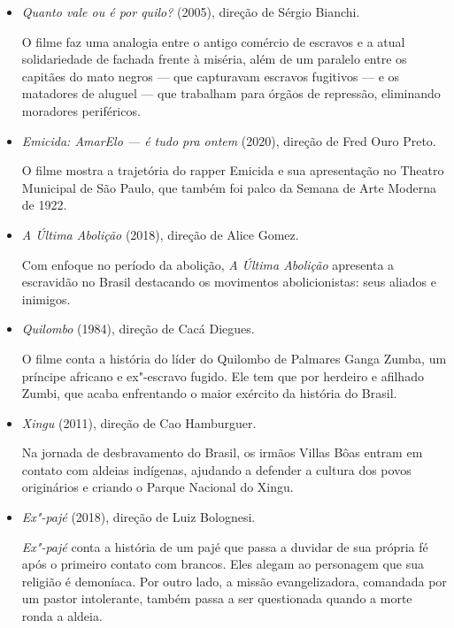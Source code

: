 \documentclass[12pt]{extarticle}
\begin{document}
\begin{itemize}
\item\emph{Quanto vale ou é por quilo?} (2005), direção de Sérgio Bianchi.

O filme faz uma analogia entre o antigo comércio de escravos e 
a atual solidariedade de fachada frente à miséria, além de um paralelo 
entre os capitães do mato negros --- que capturavam escravos 
fugitivos --- e os matadores de aluguel --- que trabalham
para órgãos de repressão, eliminando moradores periféricos.

\item\emph{Emicida: AmarElo --- é tudo pra ontem} (2020), 
direção de Fred Ouro Preto.

O filme mostra a trajetória do rapper Emicida e sua apresentação no 
Theatro Municipal de São Paulo, que também foi palco 
da Semana de Arte Moderna de 1922.

\item\emph{A Última Abolição} (2018), direção de Alice Gomez.

Com enfoque no período da abolição, \emph{A Última Abolição} apresenta 
a escravidão no Brasil destacando os movimentos 
abolicionistas: seus aliados e inimigos.

\item\emph{Quilombo} (1984), direção de Cacá Diegues.

O filme conta a história do líder do Quilombo de Palmares Ganga Zumba, 
um príncipe africano e ex"-escravo fugido. Ele tem que por herdeiro e afilhado Zumbi, 
que acaba enfrentando o maior exército da história do Brasil.

\item\emph{Xingu} (2011), direção de Cao Hamburguer.

Na jornada de desbravamento do Brasil, os irmãos Villas Bôas 
entram em contato com aldeias indígenas, ajudando a defender 
a cultura dos povos originários e criando o Parque Nacional do Xingu.

\item\emph{Ex"-pajé} (2018), direção de Luiz Bolognesi.

\emph{Ex"-pajé} conta a história de um pajé que passa a duvidar de sua 
própria fé após o primeiro contato com brancos. Eles alegam ao 
personagem que sua religião é demoníaca. Por outro lado, a 
missão evangelizadora, comandada por um pastor intolerante, 
também passa a ser questionada quando a morte ronda a aldeia.

\end{itemize}
\end{document}

